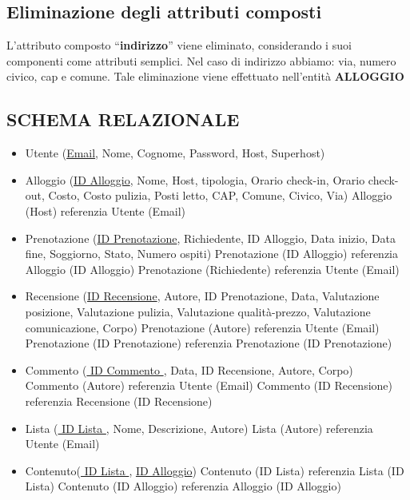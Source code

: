 \subsection{Eliminazione degli attributi composti}
L’attributo composto “\textbf{indirizzo}” viene eliminato, considerando i suoi componenti come attributi semplici. Nel caso di indirizzo abbiamo: via, numero civico, cap e comune.
Tale eliminazione viene effettuato nell'entità \textbf{ALLOGGIO}


\subsection{SCHEMA RELAZIONALE}
\begin{itemize}
  \item Utente (\underline{Email}, Nome, Cognome, Password, Host, Superhost)
  \item Alloggio (\underline{ID Alloggio}, Nome, Host, tipologia, Orario check-in, Orario check-out, Costo, Costo pulizia, Posti letto, CAP, Comune, Civico, Via)
        Alloggio (Host) referenzia Utente (Email)
  \item Prenotazione (\underline{ID Prenotazione}, Richiedente, ID Alloggio, Data inizio, Data fine, Soggiorno, Stato, Numero ospiti)
        Prenotazione (ID Alloggio) referenzia Alloggio (ID Alloggio)
        Prenotazione (Richiedente) referenzia Utente (Email)
  \item Recensione (\underline{ID Recensione}, Autore, ID Prenotazione, Data, Valutazione posizione, Valutazione pulizia, Valutazione qualità-prezzo, Valutazione comunicazione, Corpo)
        Prenotazione (Autore) referenzia Utente (Email)
        Prenotazione (ID Prenotazione) referenzia Prenotazione (ID Prenotazione)
  \item Commento (\underline{ ID Commento }, Data, ID Recensione, Autore, Corpo)
        Commento (Autore) referenzia Utente (Email)
        Commento (ID Recensione) referenzia Recensione (ID Recensione)
  \item Lista (\underline{ ID Lista }, Nome, Descrizione, Autore)
        Lista (Autore) referenzia Utente (Email)
  \item Contenuto(\underline{ ID Lista }, \underline{ID Alloggio})
        Contenuto (ID Lista) referenzia Lista (ID Lista)
        Contenuto (ID Alloggio) referenzia Alloggio (ID Alloggio)
\end{itemize}


